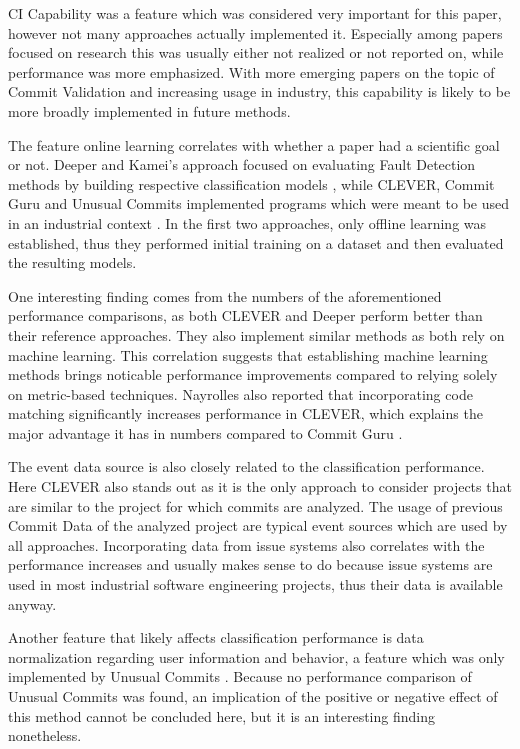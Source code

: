 CI Capability was a feature which was considered very important for this paper, however not many approaches actually implemented it. Especially among papers focused on research this was usually either not realized or not reported on, while performance was more emphasized. With more emerging papers on the topic of Commit Validation and increasing usage in industry, this capability is likely to be more broadly implemented in future methods.

The feature online learning correlates with whether a paper had a scientific goal or not. Deeper and Kamei's approach focused on evaluating Fault Detection methods by building respective classification models \cite{Yang2015, Kamei2013}, while CLEVER, Commit Guru and Unusual Commits implemented programs which were meant to be used in an industrial context \cite{Nayrolles2018,Rosen2015,Goyal2017}. In the first two approaches, only offline learning was established, thus they performed initial training on a dataset and then evaluated the resulting models.

One interesting finding comes from the numbers of the aforementioned performance comparisons, as both CLEVER and Deeper perform better than their reference approaches. They also implement similar methods as both rely on machine learning. This correlation suggests that establishing machine learning methods brings noticable performance improvements compared to relying solely on metric-based techniques. Nayrolles also reported that incorporating code matching significantly increases performance in CLEVER, which explains the major advantage it has in numbers compared to Commit Guru \cite{Nayrolles2018}.

The event data source is also closely related to the classification performance. Here CLEVER also stands out as it is the only approach to consider projects that are similar to the project for which commits are analyzed. The usage of previous Commit Data of the analyzed project are typical event sources which are used by all approaches. Incorporating data from issue systems also correlates with the performance increases and usually makes sense to do because issue systems are used in most industrial software engineering projects, thus their data is available anyway.

Another feature that likely affects classification performance is data normalization regarding user information and behavior, a feature which was only implemented by Unusual Commits \cite{Goyal2017}.
Because no performance comparison of Unusual Commits was found, an implication of the positive or negative effect of this method cannot be concluded here, but it is an interesting finding nonetheless.


